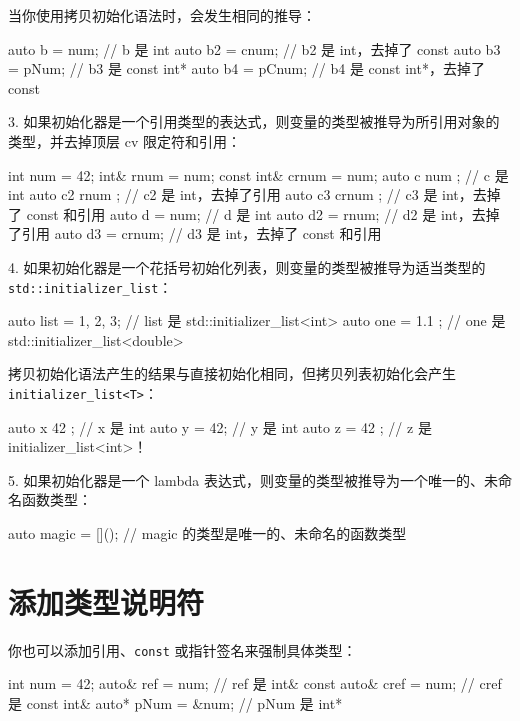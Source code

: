 当你使用拷贝初始化语法时，会发生相同的推导：

\begin{codebox}[cpp]
auto b = num;
// b 是 int
auto b2 = cnum;
// b2 是 int，去掉了 const
auto b3 = pNum;
// b3 是 const int*
auto b4 = pCnum;
// b4 是 const int*，去掉了 const
\end{codebox}

3. 如果初始化器是一个引用类型的表达式，则变量的类型被推导为所引用对象的类型，并去掉顶层 cv 限定符和引用：

\begin{codebox}[cpp]
int num = 42;
int& rnum = num;
const int& crnum = num;
auto c { num };
// c 是 int
auto c2 { rnum };
// c2 是 int，去掉了引用
auto c3 { crnum };
// c3 是 int，去掉了 const 和引用
auto d = num;
// d 是 int
auto d2 = rnum;
// d2 是 int，去掉了引用
auto d3 = crnum;
// d3 是 int，去掉了 const 和引用
\end{codebox}

4. 如果初始化器是一个花括号初始化列表，则变量的类型被推导为适当类型的 \texttt{std::initializer\_list}：

\begin{codebox}[cpp]
auto list = { 1, 2, 3}; // list 是 std::initializer_list<int>
auto one = { 1.1 };
// one 是 std::initializer_list<double>
\end{codebox}

拷贝初始化语法产生的结果与直接初始化相同，但拷贝列表初始化会产生 \texttt{initializer\_list<T>}：

\begin{codebox}[cpp]
auto x { 42 };
// x 是 int
auto y = 42;
// y 是 int
auto z = { 42 };
// z 是 initializer_list<int>！
\end{codebox}

5. 如果初始化器是一个 lambda 表达式，则变量的类型被推导为一个唯一的、未命名函数类型：

\begin{codebox}[cpp]
auto magic = [](){}; // magic 的类型是唯一的、未命名的函数类型
\end{codebox}

\section{添加类型说明符}

你也可以添加引用、\texttt{const} 或指针签名来强制具体类型：

\begin{codebox}[cpp]
int num = 42;
auto& ref = num;
// ref 是 int&
const auto& cref = num; // cref 是 const int&
auto* pNum = &num;
// pNum 是 int*
\end{codebox}

